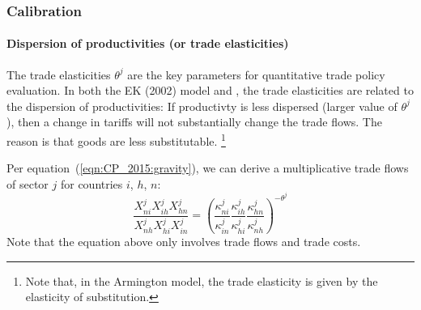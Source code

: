 \subsubsection{Calibration}
\paragraph{Dispersion of productivities (or trade elasticities)}
The trade elasticities $\theta^j$ are the key parameters for quantitative trade policy evaluation.
In both the EK (2002) model and \cite{Caliendo:2015}, 
the trade elasticities are related to the dispersion of productivities:
If productivty is less dispersed (larger value of $\theta^j$),
then a change in tariffs will not substantially change the trade flows.
The reason is that goods are less substitutable.%
\footnote{
    Note that, in the Armington model, the trade elasticity is given by 
    the elasticity of substitution.
}

Per equation~(\ref{eqn:CP_2015:gravity}),
we can derive a multiplicative trade flows of sector $j$ for countries $i$, $h$, $n$:
\begin{equation}
\frac{X_{n i}^j X_{i h}^j X_{h n}^j}{X_{n h}^j X_{h i}^j X_{i n}^j} =
\left(
    \frac{
        \kappa_{n i}^j}{\kappa_{i n}^j
    } 
    \frac{
        \kappa_{i h}^j}{\kappa_{h i}^j
    } 
    \frac{
        \kappa_{h n}^j}{\kappa_{n h}^j
    }
\right)^{-\theta^j}
\end{equation}
Note that the equation above only involves trade flows and trade costs.